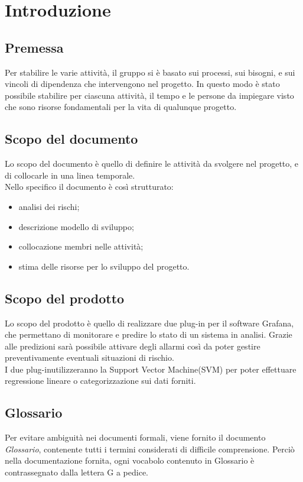 \section{Introduzione}

\subsection{Premessa}
Per stabilire le varie attività, il gruppo si è basato sui processi, sui bisogni, e sui vincoli di dipendenza che intervengono nel progetto. In questo modo è stato possibile stabilire per ciascuna attività, il tempo e le persone da impiegare visto che sono risorse fondamentali per la vita di qualunque progetto.

\subsection{Scopo del documento}
Lo scopo del documento è quello di definire le attività da svolgere nel progetto, e di collocarle in una linea temporale.\\
Nello specifico il documento è così strutturato:
\begin{itemize}
\item analisi dei rischi;
\item descrizione modello di sviluppo;
\item collocazione membri nelle attività;
\item stima delle risorse per lo sviluppo del progetto.
\end{itemize}
\subsection{Scopo del prodotto}
Lo scopo del prodotto è quello di realizzare due plug-in per il software Grafana\glo, che permettano di monitorare e predire lo stato di un sistema in analisi. Grazie alle predizioni sarà possibile attivare degli allarmi così da poter gestire preventivamente eventuali situazioni di rischio. \\
I due plug-in\glo utilizzeranno la Support Vector Machine\glo (SVM) per poter effettuare regressione lineare o categorizzazione sui dati forniti.
\begin{comment}
I due plug-in\glo utilizzeranno la Support Vector Machine\glo (SVM) o la Regressione Lineare per classificazione o regressione sui dati forniti.
\end{comment}

\subsection{Glossario}
Per evitare ambiguità nei documenti formali, viene fornito il documento \textit{Glossario}, contenente tutti i termini considerati di difficile comprensione. Perciò nella documentazione fornita, ogni vocabolo contenuto in Glossario è contrassegnato dalla lettera G a pedice.

